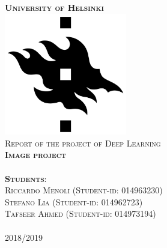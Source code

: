 \begin{titlepage}	
	\begin{center}
		
		\large{\huge \textbf{\textsc{University of Helsinki}}}
		~\\[1.0cm]
					
		\includegraphics[width=0.4\textwidth]{images/hy_logo} 
		~\\[1cm]
		
		\LARGE{\textsc{Report of the project of Deep Learning}}
		\HRuleThin		
		~\\[0.2cm]
				
		{\LARGE \textsc{\textbf{Image project}}}
		~\\[0.1cm]		

		\HRuleThin
		~\\[1.0cm]
		
		\textsc{\textbf{Students}: \\
		Riccardo Menoli (Student-id: 014963230) \\
		Stefano Lia (Student-id: 014962723) \\
		Tafseer Ahmed (Student-id: 014973194)\\ }
		~\\[0.2cm]
		\textsc{2018/2019}
	\end{center}

\end{titlepage}
